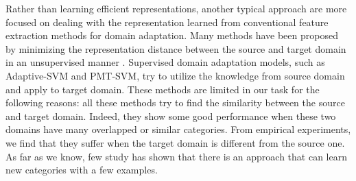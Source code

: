 Rather than learning efficient representations, another typical approach are more focused on dealing with the representation learned from conventional feature extraction methods for domain adaptation. Many methods have been proposed by minimizing the representation distance between the source and target domain in an unsupervised manner \cite{gong2012geodesic}\cite{fernando2013unsupervised}. Supervised domain adaptation models, such as Adaptive-SVM and PMT-SVM, try to utilize the knowledge from source domain and apply to target domain\cite{yang2007adapting}\cite{aytar2011tabula}. These methods are limited in our task for the following reasons: all these methods try to find the similarity between the source and target domain. Indeed, they show some good performance when these two domains have many overlapped or similar categories. From empirical experiments, we find that they suffer when the target domain is different from the source one. As far as we know, few study has shown that there is an approach that can learn new categories with a few examples.
